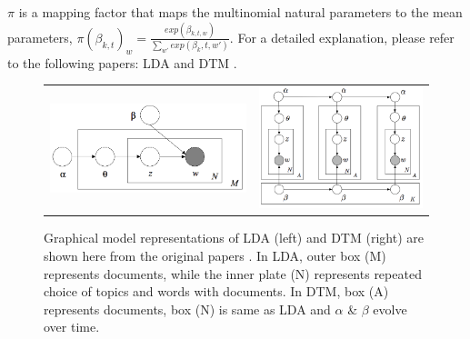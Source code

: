 \documentclass[a4paper]{report}
\begin{document}
$\pi$ is a mapping factor that maps the multinomial natural parameters to the mean parameters, $\pi(\beta_{k, t})_w = \frac{exp(\beta_{k,t,w})}{\sum_{w'} exp(\beta_k,t,w')}$. For a detailed explanation, please refer to the following papers: LDA \cite{blei2003latent} and DTM \cite{blei2006dynamic}. 
\begin{figure}[ht!]
    \begin{tabular}{cc}
    \includegraphics[scale=0.6]{lda_generative}
    & 
    \includegraphics[scale=0.6]{dtm_generative}
    \end{tabular}
\caption{Graphical model representations of LDA (left) and DTM (right) are shown here from the original papers \cite{blei2003latent, blei2006dynamic}. In LDA, outer box (M) represents documents, while the inner plate (N) represents repeated choice of topics and words with documents. In DTM, box (A) represents documents, box (N) is same as LDA and $\alpha$ \& $\beta$ evolve over time.}
\label{fig:graphical_model_representation}
\end{figure}
\end{document}
